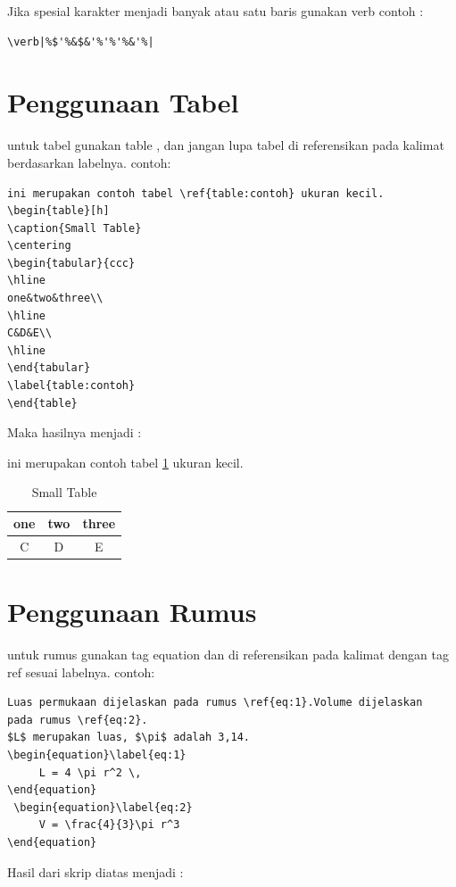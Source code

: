 Jika spesial karakter menjadi banyak atau satu baris gunakan verb
contoh :
\begin{verbatim}
\verb|%$'%&$&'%'%'%&'%|
\end{verbatim}

\section{Penggunaan Tabel}

untuk tabel gunakan table , dan jangan lupa tabel di referensikan pada kalimat berdasarkan labelnya. 
contoh:
\begin{verbatim}
ini merupakan contoh tabel \ref{table:contoh} ukuran kecil.
\begin{table}[h]
\caption{Small Table}
\centering
\begin{tabular}{ccc}
\hline
one&two&three\\
\hline
C&D&E\\
\hline
\end{tabular}
\label{table:contoh}
\end{table}
\end{verbatim}

Maka hasilnya menjadi :

ini merupakan contoh tabel \ref{table:sebuahcontoh1} ukuran kecil.
\begin{table}[h]
\caption{Small Table}
\centering
\begin{tabular}{ccc}
\hline
one&two&three\\
\hline
C&D&E\\
\hline
\end{tabular}
\label{table:sebuahcontoh1}
\end{table}


\section{Penggunaan Rumus}

untuk rumus gunakan tag equation dan di referensikan pada kalimat dengan tag ref sesuai labelnya. contoh:
\begin{verbatim}
Luas permukaan dijelaskan pada rumus \ref{eq:1}.Volume dijelaskan 
pada rumus \ref{eq:2}.
$L$ merupakan luas, $\pi$ adalah 3,14.
\begin{equation}\label{eq:1}
     L = 4 \pi r^2 \,
\end{equation}
 \begin{equation}\label{eq:2}
     V = \frac{4}{3}\pi r^3
\end{equation}
\end{verbatim}
Hasil dari skrip diatas menjadi :

